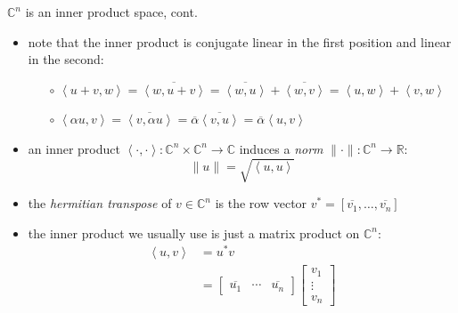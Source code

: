 \documentclass[10pt,hyperref]{beamer}
\newcommand{\CC}{\mathbb{C}}
\newcommand{\RR}{\mathbb{R}}
\newcommand{\ip}[2]{\left<#1,#2\right>}
\begin{document}
\begin{frame}{$\CC^n$ is an inner product space, cont.}

\begin{itemize}
\item note that the inner product is conjugate linear in the first position and linear in the second:
    \begin{itemize}
    \item[$\circ$] $\ip{u+v}{w} = \overline{\ip{w}{u+v}} = \overline{\ip{w}{u}} + \overline{\ip{w}{v}} = \ip{u}{w} + \ip{v}{w}$
    \item[$\circ$] $\ip{\alpha u}{v} =\overline{\ip{v}{\alpha u}} = \overline{\alpha} \overline{\ip{v}{u}} =\overline{\alpha} \ip{u}{v}$
    \end{itemize}
\item an inner product $\ip{\cdot}{\cdot} : \CC^n \times \CC^n \to \CC$ induces a \emph{norm} $\|\cdot\|:\CC^n \to \RR$:
    $$\|u\| = \sqrt{\ip{u}{u}}$$
\item the \emph{hermitian transpose} of $v\in\CC^n$ is the row vector $v^* = [\overline{v_1},\dots,\overline{v_n}]$
\item the inner product we usually use is just a matrix product on $\CC^n$:
\begin{align*}
\ip{u}{v} &= u^* v \\
          &= \begin{bmatrix}
    \overline{u_1} & \cdots & \overline{u_n}
    \end{bmatrix} \begin{bmatrix}
    v_1 \\ \vdots \\ v_n
    \end{bmatrix}
\end{align*}
\end{itemize}
\end{frame}
\end{document}
